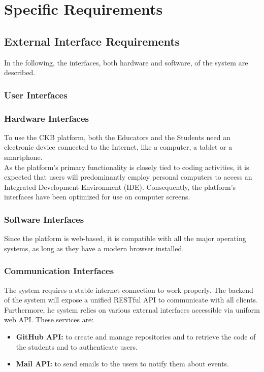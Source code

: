 \chapter{Specific Requirements}

\section{External Interface Requirements}
In the following, the interfaces, both hardware and software, of the system are described.

    {\color{red}\subsection{User Interfaces}}

\subsection{Hardware Interfaces}
To use the CKB platform, both the Educators and the Students need an electronic device connected to the Internet, like a computer, a tablet or a smartphone.\\
As the platform's primary functionality is closely tied to coding activities, it is expected that users will predominantly employ personal computers to access an Integrated Development Environment (IDE). Consequently, the platform's interfaces have been optimized for use on computer screens.

\subsection{Software Interfaces}
Since the platform is web-based, it is compatible with all the major operating systems, as long as they have a modern browser installed.

\subsection{Communication Interfaces}
The system requires a stable internet connection to work properly. The backend of the system will expose a unified RESTful API to communicate with all clients.\\
Furthermore, he system relies on various external interfaces accessible via uniform web API. These services are:
\begin{itemize}
    \item \textbf{GitHub API:} to create and manage repositories and to retrieve the code of the students and to authenticate users.
    \item \textbf{Mail API:} to send emails to the users to notify them about events.
\end{itemize}

